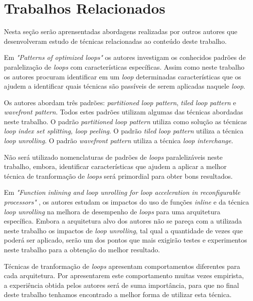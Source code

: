 
\chapter{Trabalhos Relacionados}

Nesta seção serão aprensentadas abordagens realizadas por outros autores que 
desenvolveram estudo de técnicas relacionadas ao conteúdo deste trabalho.

Em \textit{"Patterns of optimized loops"} \cite{Tasharofi:2010} os autores
investigam os conhecidos padrões de paralelização de \textit{loops} com
características específicas.  
Assim como neste trabalho os autores procuram identificar em um 
\textit{loop} determinadas características que os ajudem a identificar quais
técnicas são passíveis de serem aplicadas naquele \textit{loop}.

Os autores abordam três padrões: \textit{partitioned loop pattern}, \textit{tiled
loop pattern} e \textit{wavefront pattern}. 
Todos estes padrões utilizam algumas das técnicas abordadas neste trabalho. 
O padrão \textit{partitioned loop pattern} utiliza como solução as técnicas
\textit{loop index set splitting, loop peeling}. 
O padrão \textit{tiled loop pattern} utiliza a técnica \textit{loop unrolling}. 
O padrão \textit{wavefront pattern} utiliza a técnica \textit{loop interchange}.

Não será utilizado nomenclaturas de padrões de \textit{loops} paralelizáveis
neste trabalho, embora, identificar características que ajudem a aplicar a
melhor técnica de tranformação de \textit{loops} será primordial para obter bons
resultados.


Em \textit{"Function inlining and loop unrolling for loop acceleration in
reconfigurable processors"} \cite{Miniskar:2012}, os autores estudam os impactos
do uso de funções \textit{inline} e da técnica \textit{loop unrolling} na
melhora de desempenho de \textit{loops} para uma arquitetura específica.
Embora a arquitetura alvo dos autores não se pareça com a utilizada neste trabalho 
os impactos de \textit{loop unrolling}, tal qual a quantidade de vezes que poderá ser 
aplicado, serão um dos pontos que mais exigirão testes e experimentos neste 
trabalho para a obtenção do melhor resultado.

Técnicas de tranformação de \textit{loops} apresentam comportamentos diferentes 
para cada arquitetura. 
Por apresentarem este comportamento muitas vezes empirista, a experiência obtida
pelos autores será de suma importância, para que no final deste trabalho tenhamos
encontrado a melhor forma de utilizar esta técnica.

